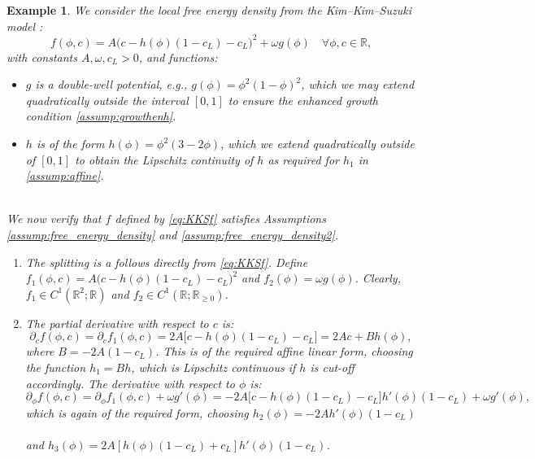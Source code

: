 \documentclass[]{article}
\newtheorem{example}{Example}
\newcommand{\R}{\mathbb{R}}
\begin{document}
\begin{example}\label{Ex:KKSdensity}
We consider the local free energy density from the Kim--Kim--Suzuki model \cite[Eq.~(15)]{kim1999phase}:
\begin{equation}\label{eq:KKSf}
	f(\phi,c) = A\bigl(c - h(\phi)(1 - c_L) - c_L\bigr)^2 + \omega g(\phi) \quad \forall \phi, c \in \mathbb{R},
\end{equation}
with constants \(A, \omega, c_L > 0\), and functions:\\[-0.5em]
\begin{itemize}
	\item $g$ is a double-well potential, e.g., $g(\phi) = \phi^2(1-\phi)^2$, which we may extend quadratically outside the interval $[0,1]$ to ensure the enhanced growth condition \eqref{assump:growthenh}.
	\item $h$ is of the form $h(\phi) =\phi^2(3-2\phi)$, which we extend quadratically outside of $[0,1]$ to obtain the Lipschitz continuity of $h$ as required for $h_1$ in \eqref{assump:affine}. 
\end{itemize} 
\ \\
We now verify that $f$ defined by \eqref{eq:KKSf} satisfies Assumptions \ref{assump:free_energy_density} and \ref{assump:free_energy_density2}. \\[-0.5em]
\begin{enumerate}[label=\textup{(F\arabic*)}, ref=F\arabic*]
	\item The splitting is a follows directly from \eqref{eq:KKSf}. Define $f_1(\phi, c)= A\bigl(c - h(\phi)(1 - c_L) - c_L\bigr)^2$ and
	$f_2(\phi) = \omega g(\phi)$.
	Clearly, $f_1 \in C^1(\R^2; \R)$ and $f_2 \in C^1(\R; \R_{\geq 0})$.
	
	\item The partial derivative with respect to $c$ is:
	\begin{equation} \label{Eq:DerivFc}
		\partial_c f(\phi,c) = \partial_c f_1(\phi,c) = 2A\bigl[c - h(\phi)(1 - c_L) - c_L\bigr] = 2A c + B h(\phi),
	\end{equation}
	where $B = -2A(1-c_L)$. This is of the required affine linear form, choosing the function $h_1=Bh$, which is Lipschitz continuous if $h$ is cut-off accordingly. The derivative with respect to $\phi$ is:
	\begin{equation} \label{Eq:DerivFphi}
		\partial_\phi f(\phi,c)=\partial_\phi f_1(\phi,c)+\omega g'(\phi) = -2A\bigl[c - h(\phi)(1 - c_L) - c_L\bigr] h'(\phi)(1-c_L) + \omega g'(\phi),
	\end{equation}
	which is again of the required form, choosing $h_2(\phi)=-2Ah'(\phi)(1-c_L)$ \ \\
	and $h_3(\phi)=2A[h(\phi)(1-c_L)+c_L]h'(\phi)(1-c_L)$.
	

\end{enumerate}
\end{example}
\end{document}

